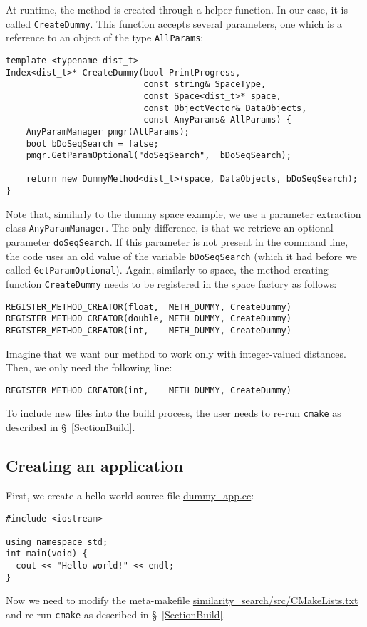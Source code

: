 \documentclass[runningheads,a4paper]{llncs}
\newcommand{\ttt}[1]{\texttt{#1}}
\begin{document}
\newpage
At runtime, the method is created through a helper function.
In our case, it is called \ttt{CreateDummy}.
This function accepts several parameters,
one which is a reference to an object of the type \ttt{AllParams}:
\begin{verbatim}
template <typename dist_t>
Index<dist_t>* CreateDummy(bool PrintProgress,
                           const string& SpaceType,
                           const Space<dist_t>* space,
                           const ObjectVector& DataObjects,
                           const AnyParams& AllParams) {
    AnyParamManager pmgr(AllParams);
    bool bDoSeqSearch = false;
    pmgr.GetParamOptional("doSeqSearch",  bDoSeqSearch);

    return new DummyMethod<dist_t>(space, DataObjects, bDoSeqSearch);
}
\end{verbatim}
Note that, similarly to the dummy space example,
we use a parameter extraction class \ttt{AnyParamManager}.
The only difference, is that we retrieve an optional parameter \ttt{doSeqSearch}.
If this parameter is not present in the command line,
the code uses an old value of the variable \ttt{bDoSeqSearch}
(which it had before we called \ttt{GetParamOptional}). 
Again, similarly to space, the method-creating function \ttt{CreateDummy} needs
to be registered in the space factory as follows:
\begin{verbatim}
REGISTER_METHOD_CREATOR(float,  METH_DUMMY, CreateDummy)
REGISTER_METHOD_CREATOR(double, METH_DUMMY, CreateDummy)
REGISTER_METHOD_CREATOR(int,    METH_DUMMY, CreateDummy)
\end{verbatim}
Imagine that we want our method to work only with integer-valued distances.
Then, we only need the following line:
\begin{verbatim}
REGISTER_METHOD_CREATOR(int,    METH_DUMMY, CreateDummy)
\end{verbatim}
To include new files into the build process, 
the user needs to re-run \ttt{cmake} as described in \S~\ref{SectionBuild}.

\subsection{Creating an application}\label{SectionCreateApp}
First, we create a hello-world source file 
\href{https://github.com/searchivarius/NonMetricSpaceLib/tree/master/similarity_search/src/dummy_app.cc}{dummy\_app.cc}:
\begin{verbatim}
#include <iostream>

using namespace std;
int main(void) {
  cout << "Hello world!" << endl;
}
\end{verbatim}
Now we need to modify the meta-makefile
\href{https://github.com/searchivarius/NonMetricSpaceLib/blob/master/similarity_search/src/CMakeLists.txt}{similarity\_search/src/CMakeLists.txt} and 
re-run \ttt{cmake} as described in \S~\ref{SectionBuild}.
\end{document}
